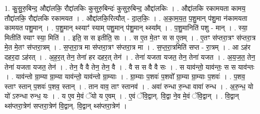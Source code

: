 \documentclass[17pt]{extarticle}
\begin{document}
1. कु॒सु॒रु॒बिन्द॒ औद्दा॑लकि॒ रौद्दा॑लकिः कुसुरु॒बिन्दः॑ कुसुरु॒बिन्द॒ औद्दा॑लकिः । . औद्दा॑लकि रकामयता कामय॒ तौद्दा॑लकि॒ रौद्दा॑लकि रकामयत । . औद्दा॑लकि॒रित्यौत् - दा॒ल॒किः॒ । . अ॒का॒म॒य॒त॒ प॒शु॒मान् प॑शु॒मा न॑कामयता कामयत पशु॒मान् । . प॒शु॒मान् थ्स्याꣳ॑ स्याम् पशु॒मान् प॑शु॒मान् थ्स्या᳚म् । . प॒शु॒मानिति॑ पशु - मान् । . स्या॒ मितीति॑ स्याꣳ स्या॒ मिति॑ । . इति॒ स स इतीति॒ सः । . स ए॒त मे॒तꣳ स स ए॒तम् । . ए॒तꣳ स॑प्तरा॒त्रꣳ स॑प्तरा॒त्र मे॒त मे॒तꣳ स॑प्तरा॒त्रम् । . स॒प्त॒रा॒त्र मा स॑प्तरा॒त्रꣳ स॑प्तरा॒त्र मा । . स॒प्त॒रा॒त्रमिति॑ सप्त - रा॒त्रम् । . आ ऽह॑र दहर॒दा ऽह॑रत् । . अ॒ह॒र॒त् तेन॒ तेना॑ हर दहर॒त् तेन॑ । . तेना॑ यजता यजत॒ तेन॒ तेना॑ यजत । . अ॒य॒ज॒त॒ तेन॒ तेना॑ यजता यजत॒ तेन॑ । . तेन॒ वै वै तेन॒ तेन॒ वै । . वै स स वै वै सः । . स याव॑न्तो॒ याव॑न्तः॒ स स याव॑न्तः । . याव॑न्तो ग्रा॒म्या ग्रा॒म्या याव॑न्तो॒ याव॑न्तो ग्रा॒म्याः । . ग्रा॒म्याः प॒शवः॑ प॒शवो᳚ ग्रा॒म्या ग्रा॒म्याः प॒शवः॑ । . प॒शव॒ स्ताꣳ स्तान् प॒शवः॑ प॒शव॒ स्तान् । . तान वाव॒ ताꣳ स्तानव॑ । . अवा॑ रुन्धा रु॒न्धा वावा॑ रुन्ध । . अ॒रु॒न्ध॒ यो यो॑ ऽरुन्धा रुन्ध॒ यः । . य ए॒व मे॒वं ॅयो य ए॒वम् । . ए॒वं ॅवि॒द्वान्. वि॒द्वा ने॒व मे॒वं ॅवि॒द्वान् । . वि॒द्वान् थ्स॑प्तरा॒त्रेण॑ सप्तरा॒त्रेण॑ वि॒द्वान्. वि॒द्वान् थ्स॑प्तरा॒त्रेण॑ । \newline
\end{document}
